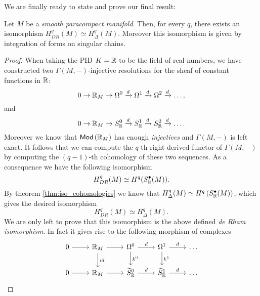 We are finally ready to state and prove our final result:
\begin{thm}[De Rham]
	Let $M$ be a \textit{smooth paracompact manifold}.
	Then, for every $q$, there exists an isomorphism $H^q_{DR}(M) \simeq H^q_\Delta(M)$.
	Moreover this isomorphism is given by integration of forms on singular chains.
\end{thm}
\begin{proof}
	When taking the PID $K = \mathbb{R}$ to be the field of real numbers, we have constructed two $\Gamma(M,-)$-injective resolutions for the sheaf of constant functions in $\mathbb{R}$:
	\begin{equation}
		0 \to \mathbb{R}_M \to \Omega^0 \xrightarrow{d} \Omega^1 \xrightarrow{d} \Omega^2 \xrightarrow{d} \dots
	,\end{equation} 
	and
	\begin{equation}
		0 \to \mathbb{R}_M \to S^0_{\mathbb{R}} \xrightarrow{d} S^1_{\mathbb{R}} \xrightarrow{d} S^2_{\mathbb{R}} \xrightarrow{d} \dots
	.\end{equation} 
	Moreover we know that $\mathsf{Mod}\left( \mathbb{R}_M \right)$ has enough \textit{injectives} and $\Gamma(M,-)$ is left exact.
	It follows that we can compute the $q$-th right derived functor of $\Gamma(M,-)$ by computing the $(q-1)$-th cohomology of these two sequences.
	As a consequence we have the following isomorphism
	\begin{equation}\label{eqn:cohom_iso_res}
		H^q_{DR}(M) \simeq H^q(S^\bullet_{\mathbb{R}}(M))
	.\end{equation} 
	By theorem \ref{thm:iso_cohomologies} we know that $H^q_\Delta(M) \simeq H^q \left( S^\bullet_{\mathbb{R}}(M)\right)$, which gives the desired isomorphism
	\begin{equation}
		H^q_{DR}(M) \simeq H^q_\Delta(M)
	.\end{equation} 
	We are only left to prove that this isomorphism is the above defined \textit{de Rham isomorphism}.
	In fact it gives rise to the following morphism of complexes
	\begin{equation}
	\begin{tikzcd}
		0 \arrow[r, "", rightarrow] & \R_M \arrow[r, "", rightarrow] \arrow[d, "id", rightarrow] & \Omega^0 \arrow[r, "d", rightarrow] \arrow[d, "k^0", rightarrow] & \Omega^1 \arrow[r, "d", rightarrow] \arrow[d, "k^1", rightarrow] & \dots \\
		0 \arrow[r, "", rightarrow] & \R_M \arrow[r, "", rightarrow] & \widetilde{S}^0_\R \arrow[r, "d", rightarrow] & \widetilde{S}^1_\R \arrow[r, "d", rightarrow] & \dots
	\end{tikzcd}

\end{equation}
\end{proof}
